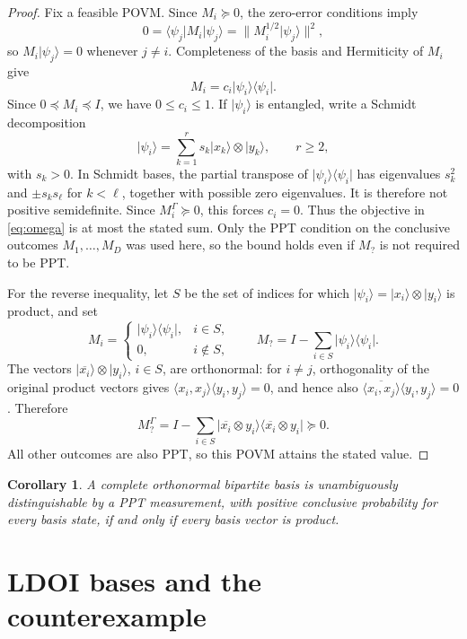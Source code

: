 \documentclass[11pt]{amsart}
\newtheorem{corollary}[theorem]{Corollary}
\theoremstyle{remark}
\newcommand{\ket}[1]{\lvert #1\rangle}
\newcommand{\bra}[1]{\langle #1\rvert}
\newcommand{\proj}[1]{\ket{#1}\!\bra{#1}}
\begin{document}
\begin{proof}
Fix a feasible POVM. Since $M_i\succeq0$, the zero-error conditions imply
\[
  0=\bra{\psi_j}M_i\ket{\psi_j}
   =\bigl\|M_i^{1/2}\ket{\psi_j}\bigr\|^2,
\]
so $M_i\ket{\psi_j}=0$ whenever $j\neq i$. Completeness of the basis and
Hermiticity of $M_i$ give
\[
  M_i=c_i\proj{\psi_i}.
\]
Since $0\preceq M_i\preceq I$, we have $0\leq c_i\leq1$.
If $\ket{\psi_i}$ is entangled, write a Schmidt decomposition
\[
  \ket{\psi_i}=\sum_{k=1}^{r}s_k\ket{x_k}\otimes\ket{y_k},
  \qquad r\geq2,
\]
with $s_k>0$. In Schmidt bases, the partial transpose of
$\proj{\psi_i}$ has eigenvalues $s_k^2$ and $\pm s_ks_\ell$ for
$k<\ell$, together with possible zero eigenvalues. It is therefore not
positive semidefinite. Since $M_i^\Gamma\succeq0$, this forces $c_i=0$.
Thus the objective in \eqref{eq:omega} is at most the stated sum. Only the PPT
condition on the conclusive outcomes $M_1,\ldots,M_D$ was used here, so the
bound holds even if $M_{?}$ is not required to be PPT.

For the reverse inequality, let $S$ be the set of indices for which
$\ket{\psi_i}=\ket{x_i}\otimes\ket{y_i}$ is product, and set
\[
  M_i=
  \begin{cases}
    \proj{\psi_i},&i\in S,\\
    0,&i\notin S,
  \end{cases}
  \qquad
  M_{?}=I-\sum_{i\in S}\proj{\psi_i}.
\]
The vectors $\ket{\overline{x_i}}\otimes\ket{y_i}$, $i\in S$, are
orthonormal: for $i\neq j$, orthogonality of the original product vectors
gives $\langle x_i,x_j\rangle\langle y_i,y_j\rangle=0$, and hence also
$\overline{\langle x_i,x_j\rangle}\langle y_i,y_j\rangle=0$. Therefore
\[
  M_{?}^{\Gamma}
  =I-\sum_{i\in S}
    \proj{\overline{x_i}\otimes y_i}
  \succeq0.
\]
All other outcomes are also PPT, so this POVM attains the stated value.
\end{proof}

\begin{corollary}\label{cor:criterion}
A complete orthonormal bipartite basis is unambiguously distinguishable by a
PPT measurement, with positive conclusive probability for every basis state,
if and only if every basis vector is product.
\end{corollary}

\section{LDOI bases and the counterexample}
\end{document}
